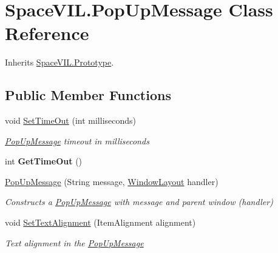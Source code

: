 \hypertarget{class_space_v_i_l_1_1_pop_up_message}{}\section{Space\+V\+I\+L.\+Pop\+Up\+Message Class Reference}
\label{class_space_v_i_l_1_1_pop_up_message}


Inherits \mbox{\hyperlink{class_space_v_i_l_1_1_prototype}{Space\+V\+I\+L.\+Prototype}}.

\subsection*{Public Member Functions}
\begin{DoxyCompactItemize}
\item 
void \mbox{\hyperlink{class_space_v_i_l_1_1_pop_up_message_aed1edbb9ca961585032b46bebd61fbea}{Set\+Time\+Out}} (int milliseconds)
\begin{DoxyCompactList}\small\item\em \mbox{\hyperlink{class_space_v_i_l_1_1_pop_up_message}{Pop\+Up\+Message}} timeout in milliseconds \end{DoxyCompactList}\item 
\mbox{\label{class_space_v_i_l_1_1_pop_up_message_aca66f9ab026cee580727ebdbce2efd83}} 
int {\bfseries Get\+Time\+Out} ()
\item 
\mbox{\hyperlink{class_space_v_i_l_1_1_pop_up_message_ab0331b1354c101d640ed34ec060b3bcf}{Pop\+Up\+Message}} (String message, \mbox{\hyperlink{class_space_v_i_l_1_1_window_layout}{Window\+Layout}} handler)
\begin{DoxyCompactList}\small\item\em Constructs a \mbox{\hyperlink{class_space_v_i_l_1_1_pop_up_message}{Pop\+Up\+Message}} with message and parent window (handler) \end{DoxyCompactList}\item 
void \mbox{\hyperlink{class_space_v_i_l_1_1_pop_up_message_af4bf4824354cfdbe240c1fc613bc796e}{Set\+Text\+Alignment}} (Item\+Alignment alignment)
\begin{DoxyCompactList}\small\item\em Text alignment in the \mbox{\hyperlink{class_space_v_i_l_1_1_pop_up_message}{Pop\+Up\+Message}} \end{DoxyCompactList}\item 

\end{DoxyCompactItemize}
